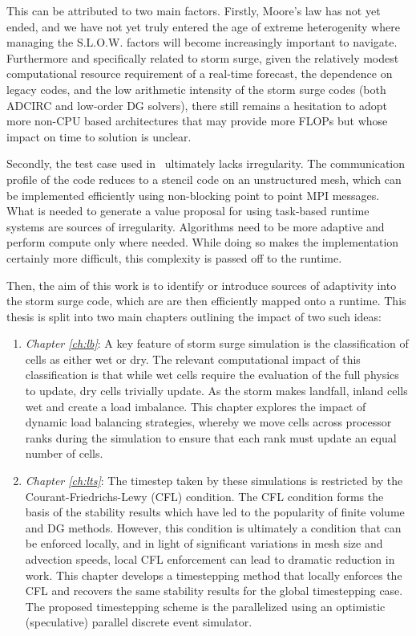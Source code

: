 This can be attributed to two main factors. Firstly, Moore's law has not yet ended, and we have not yet truly entered the age of extreme heterogenity where managing the S.L.O.W. factors will become increasingly important to navigate. 
Furthermore and specifically related to storm surge, given the relatively modest computational resource requirement of a real-time forecast, the dependence on legacy codes, and the low arithmetic intensity of the storm surge codes (both ADCIRC and low-order DG solvers), there still remains a hesitation to adopt more non-CPU based architectures that may provide more FLOPs but whose impact on time to solution is unclear.

Secondly, the test case used in~\cite{Bremer2019} ultimately lacks irregularity. The communication profile of the code reduces to a stencil code on an unstructured mesh, which can be implemented efficiently using non-blocking point to point MPI messages. What is needed to generate a value proposal for using task-based runtime systems are sources of irregularity. Algorithms need to be more adaptive and perform compute only where needed. While doing so makes the implementation certainly more difficult, this complexity is passed off to the runtime.

Then, the aim of this work is to identify or introduce sources of adaptivity into the storm surge code, which are are then efficiently mapped onto a runtime. This thesis is split into two main chapters outlining the impact of two such ideas:
\begin{enumerate}
\item {\em Chapter \ref{ch:lb}}: A key feature of storm surge simulation is the classification of cells as either wet or dry. The relevant computational impact of this classification is that while wet cells require the evaluation of the full physics to update, dry cells trivially update. As the storm makes landfall, inland cells wet and create a load imbalance. This chapter explores the impact of dynamic load balancing strategies, whereby we move cells across processor ranks during the simulation to ensure that each rank must update an equal number of cells.
\item {\em Chapter \ref{ch:lts}}: The timestep taken by these simulations is restricted by the Courant-Friedrichs-Lewy (CFL) condition. The CFL condition forms the basis of the stability results which have led to the popularity of finite volume and DG methods. However, this condition is ultimately a condition that can be enforced locally, and in light of significant variations in mesh size and advection speeds, local CFL enforcement can lead to dramatic reduction in work. This chapter develops a timestepping method that locally enforces the CFL and recovers the same stability results for the global timestepping case. The proposed timestepping scheme is the parallelized using an optimistic (speculative) parallel discrete event simulator.
\end{enumerate}